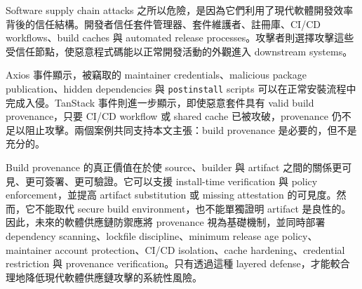 \documentclass[12pt,a4paper]{article}
\begin{document}
Software supply chain attacks 之所以危險，是因為它們利用了現代軟體開發效率背後的信任結構。開發者信任套件管理器、套件維護者、註冊庫、CI/CD workflows、build caches 與 automated release processes。攻擊者則選擇攻擊這些受信任節點，使惡意程式碼能以正常開發活動的外觀進入 downstream systems。

Axios 事件顯示，被竊取的 maintainer credentials、malicious package publication、hidden dependencies 與 \texttt{postinstall} scripts 可以在正常安裝流程中完成入侵。TanStack 事件則進一步顯示，即使惡意套件具有 valid build provenance，只要 CI/CD workflow 或 shared cache 已被攻破，provenance 仍不足以阻止攻擊。兩個案例共同支持本文主張：build provenance 是必要的，但不是充分的。

Build provenance 的真正價值在於使 source、builder 與 artifact 之間的關係更可見、更可簽署、更可驗證。它可以支援 install-time verification 與 policy enforcement，並提高 artifact substitution 或 missing attestation 的可見度。然而，它不能取代 secure build environment，也不能單獨證明 artifact 是良性的。因此，未來的軟體供應鏈防禦應將 provenance 視為基礎機制，並同時部署 dependency scanning、lockfile discipline、minimum release age policy、maintainer account protection、CI/CD isolation、cache hardening、credential restriction 與 provenance verification。只有透過這種 layered defense，才能較合理地降低現代軟體供應鏈攻擊的系統性風險。
\end{document}
